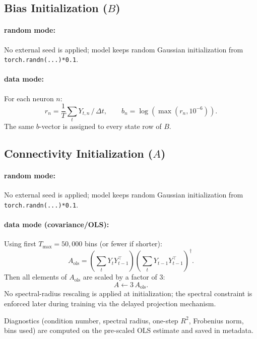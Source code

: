 \documentclass[11pt]{article}
\begin{document}
\subsection{Bias Initialization (\(B\))}

\paragraph{random mode:}
No external seed is applied; model keeps random Gaussian initialization from
\texttt{torch.randn(...)*0.1}.

\paragraph{data mode:}
For each neuron \(n\):
\[
r_n = \frac{1}{T}\sum_t Y_{t,n}\,/\,\Delta t,\qquad
b_n = \log(\max(r_n,10^{-6})).
\]
The same \(b\)-vector is assigned to every state row of \(B\).

\subsection{Connectivity Initialization (\(A\))}

\paragraph{random mode:}
No external seed is applied; model keeps random Gaussian initialization from
\texttt{torch.randn(...)*0.1}.

\paragraph{data mode (covariance/OLS):}
Using first \(T_{\max}=50{,}000\) bins (or fewer if shorter):
\[
A_{\mathrm{ols}}
=
\left(\sum_t Y_tY_{t-1}^\top\right)
\left(\sum_t Y_{t-1}Y_{t-1}^\top\right)^{\dagger}.
\]
Then all elements of \(A_{\mathrm{ols}}\) are scaled by a factor of 3:
\[
A \leftarrow 3\,A_{\mathrm{ols}}.
\]
No spectral-radius rescaling is applied at initialization; the spectral constraint is enforced later during training via the delayed projection mechanism.

Diagnostics (condition number, spectral radius, one-step \(R^2\), Frobenius norm,
bins used) are computed on the pre-scaled OLS estimate and saved in metadata.
\end{document}
